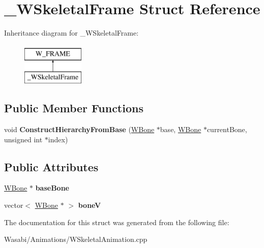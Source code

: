 \hypertarget{struct___w_skeletal_frame}{}\section{\+\_\+\+W\+Skeletal\+Frame Struct Reference}
\label{struct___w_skeletal_frame}
Inheritance diagram for \+\_\+\+W\+Skeletal\+Frame\+:\begin{figure}[H]
\begin{center}
\leavevmode
\includegraphics[height=2.000000cm]{struct___w_skeletal_frame}
\end{center}
\end{figure}
\subsection*{Public Member Functions}
\begin{DoxyCompactItemize}
\item 
void {\bfseries Construct\+Hierarchy\+From\+Base} (\hyperlink{class_w_bone}{W\+Bone} $\ast$base, \hyperlink{class_w_bone}{W\+Bone} $\ast$current\+Bone, unsigned int $\ast$index)\hypertarget{struct___w_skeletal_frame_a83b8899122b45dbfe39e7f578a3f1683}{}\label{struct___w_skeletal_frame_a83b8899122b45dbfe39e7f578a3f1683}

\end{DoxyCompactItemize}
\subsection*{Public Attributes}
\begin{DoxyCompactItemize}
\item 
\hyperlink{class_w_bone}{W\+Bone} $\ast$ {\bfseries base\+Bone}\hypertarget{struct___w_skeletal_frame_a1e2bc7aee42146c6c7f058b1c265af00}{}\label{struct___w_skeletal_frame_a1e2bc7aee42146c6c7f058b1c265af00}

\item 
vector$<$ \hyperlink{class_w_bone}{W\+Bone} $\ast$ $>$ {\bfseries boneV}\hypertarget{struct___w_skeletal_frame_a6a1d0bcf7bb4d90c1c34ceaab7d6ad39}{}\label{struct___w_skeletal_frame_a6a1d0bcf7bb4d90c1c34ceaab7d6ad39}

\end{DoxyCompactItemize}


The documentation for this struct was generated from the following file\+:\begin{DoxyCompactItemize}
\item 
Wasabi/\+Animations/W\+Skeletal\+Animation.\+cpp\end{DoxyCompactItemize}
